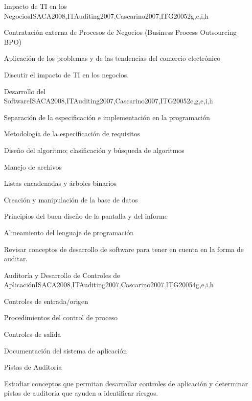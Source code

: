 \begin{syllabus}
	\begin{unit}{Impacto de TI en los Negocios}{}{ISACA2008,ITAuditing2007,Cascarino2007,ITG2005}{2}{g,e,i,h}
	\begin{topics}
	\item Contratación externa de Procesos de Negocios (Business Process Outsourcing BPO)
	\item Aplicación de los problemas y de las tendencias del comercio electrónico
	\end{topics}
	\begin{learningoutcomes}
	\item Discutir el impacto de TI en los negocios.
	\end{learningoutcomes}
	\end{unit}
	
	\begin{unit}{Desarrollo del Software}{}{ISACA2008,ITAuditing2007,Cascarino2007,ITG2005}{2}{c,g,e,i,h}
	\begin{topics}
	\item Separación de la especificación e implementación en la programación
	\item Metodología de la especificación de requisitos
	\item Diseño del algoritmo; clasificación y búsqueda de algoritmos
	\item Manejo de archivos
	\item Listas encadenadas y árboles binarios
	\item Creación y manipulación de la base de datos
	\item Principios del buen diseño de la pantalla y del informe
	\item Alineamiento del lenguaje de programación
	\end{topics}
	\begin{learningoutcomes}
	\item Revisar conceptos de desarrollo de software para tener en cuenta en la forma de auditar.
	\end{learningoutcomes}
	\end{unit}
	
	\begin{unit}{Auditoría y Desarrollo de Controles de Aplicación}{}{ISACA2008,ITAuditing2007,Cascarino2007,ITG2005}{4}{g,e,i,h}
	\begin{topics}
	\item Controles de entrada/origen
	\item Procedimientos del control de proceso
	\item Controles de salida
	\item Documentación del sistema de aplicación
	\item Pistas de Auditoría
	\end{topics}
	\begin{learningoutcomes}
	\item Estudiar conceptos que permitan desarrollar controles de aplicación y determinar pistas de auditoria que ayuden a identificar riesgos.
	\end{learningoutcomes}
	\end{unit}
	

\end{syllabus}
